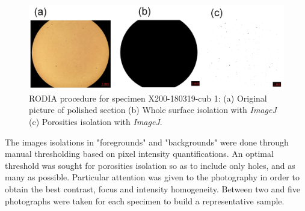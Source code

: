 \begin{center}
\begin{table}[h]
\noindent{}

\caption[Polishing routine for Al-Si alloys]{Polishing routine for Al-Si alloys}
\label{tab:pol}
\end{table}
\end{center}

\begin{figure}[h]
\centering
\centerline{\includegraphics[scale=0.29]{Images/ImageJ-cub1}}
\decoRule
\caption[RODIA procedure for specimen X200-180319-cub 1: (a) Original picture of polished section (b) Whole surface isolation with \textit{ImageJ} (c) Porosities isolation with \textit{ImageJ}.]{RODIA procedure for specimen X200-180319-cub 1: (a) Original picture of polished section (b) Whole surface isolation with \textit{ImageJ} (c) Porosities isolation with \textit{ImageJ}.}
\label{fig:ImageJ}
\end{figure}

The images isolations in "foregrounds" and "backgrounds" were done through manual thresholding based on pixel intensity quantifications.  %
An optimal threshold was sought for porosities isolation so as to include only holes, and as many as possible. Particular attention was given to the photography in order to obtain the best contrast, focus and intensity homogeneity. Between two and five photographs were taken for each specimen to build a representative sample.

